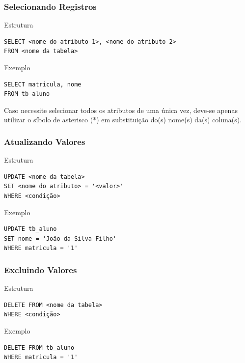 \documentclass{beamer}
\begin{document}
\begin{frame}[fragile]
\frametitle{Selecionando Registros}

\begin{block}{Estrutura}
\begin{lstlisting}
SELECT <nome do atributo 1>, <nome do atributo 2>
FROM <nome da tabela>
\end{lstlisting}
\end{block}\vfill

\begin{exampleblock}{Exemplo}
\begin{lstlisting}
SELECT matricula, nome
FROM tb_aluno
\end{lstlisting}
\end{exampleblock}\vfill

\alert{Caso necessite selecionar todos os atributos de uma única vez, deve-se
	apenas utilizar o síbolo de asterisco (*) em substituição do(s) nome(s)
	da(s) coluna(s).}
\end{frame}

\begin{frame}[fragile]
\frametitle{Atualizando Valores}

\begin{block}{Estrutura}
\begin{lstlisting}
UPDATE <nome da tabela>
SET <nome do atributo> = '<valor>'
WHERE <condição>
\end{lstlisting}
\end{block}\vfill

\begin{exampleblock}{Exemplo}
\begin{lstlisting}
UPDATE tb_aluno
SET nome = 'João da Silva Filho'
WHERE matricula = '1'
\end{lstlisting}
\end{exampleblock}
\end{frame}

\begin{frame}[fragile]
\frametitle{Excluindo  Valores}

\begin{block}{Estrutura}
\begin{lstlisting}
DELETE FROM <nome da tabela>
WHERE <condição>
\end{lstlisting}
\end{block}\vfill

\begin{exampleblock}{Exemplo}
\begin{lstlisting}
DELETE FROM tb_aluno
WHERE matricula = '1'
\end{lstlisting}
\end{exampleblock}
\end{frame}
\end{document}
